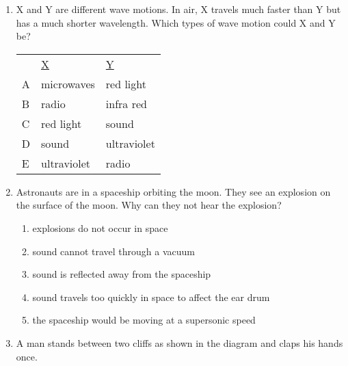 \begin{eocexercises}{}
\begin{enumerate}
\item X and Y are different wave motions. In air, X travels much faster than Y but has a much shorter wavelength. Which types of wave motion could X and Y be?

\begin{tabular}{lll}
& \underline{X} & \underline{Y}\\
A & microwaves & red light\\
B & radio & infra red\\
C & red light & sound\\
D & sound & ultraviolet\\
E & ultraviolet & radio\\
\end{tabular}

\item Astronauts are in a spaceship orbiting the moon. They see an explosion on the surface of the moon. Why can they not hear the explosion?
\begin{enumerate}
\item explosions do not occur in space
\item sound cannot travel through a vacuum
\item sound is reflected away from the spaceship
\item sound travels too quickly in space to affect the ear drum
\item the spaceship would be moving at a supersonic speed
\end{enumerate}

\item A man stands between two cliffs as shown in the diagram and claps his hands once.


\end{enumerate}
\end{eocexercises}
